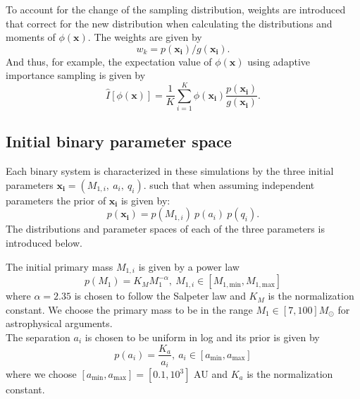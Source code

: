 \documentclass[a4paper,fleqn,usenatbib]{mnras}
\begin{document}
To account for the change of the sampling distribution, weights are introduced that correct for the new distribution when calculating the distributions and moments of $\phi(\mathbf{x})$. The weights are given by 
%
\begin{equation}
w_k = p(\mathbf{x_i})/g(\mathbf{x_i}) .
\end{equation}
%
And thus, for example, the expectation value of  $\phi(\mathbf{x})$ using adaptive importance sampling is  given by
%
\begin{equation}
    \hat{I}[\phi(\mathbf{x})] = \frac{1}{K} \sum_{i=1}^{K} \phi(\mathbf{x_i}) \frac{p(\mathbf{x_i})}{g(\mathbf{x_i})}. 
	\label{eq:ISestimator}
\end{equation}





	



\subsection{Initial binary parameter space}
\label{subsec:BPS-prior}

Each binary system is characterized  in these simulations by the three initial parameters $\mathbf{x_i} = (M_{1,i},\ a_i, \ q_i). $ such that when assuming independent parameters the prior of   $\mathbf{x_i}$ is given by: 
%
\begin{equation}
p(\mathbf{x_i}) = p({M_{1,i}}) \ p({a_i}) \  p({q_i}).
\end{equation}
%
The distributions and parameter spaces of each of the three parameters is introduced below. 



The initial primary mass $M_{1,i}$ is given by a power law  
%
\begin{equation}
    p(M_1) = K_M M_1^{-\alpha},  \ M_{1,i} \in [M_{1,\text{min}} , M_{1,\text{max}} ]
	\label{eq:prior-IMF}
\end{equation} 
%
where $\alpha = 2.35$ is chosen to follow the Salpeter law and $K_M$ is the normalization constant. We choose the primary mass to be in the range $M_1 \in [7,100] M_{\odot}$ for astrophysical arguments.  \\

The separation $a_i$ is chosen to be uniform in log and 	its prior is given by
%
\begin{equation}
    p(a_i) = \frac{K_a }{a_i},   \ a_i \in [a_{\text{min}} , a_{\text{max}} ]
	\label{eq:prior-separation}
\end{equation} 
%
where we choose $[a_{\text{min}} , a_{\text{max}} ] =  [0.1,10^3]  $ AU and $K_a$ is the normalization constant. \\
\end{document}

